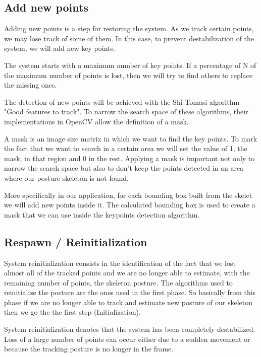 \documentclass[runningheads,a4paper,11pt]{report}
\begin{document}
\subsection{Add new points}
\par Adding new points is a step for restoring the system. As we track certain points, we may lose track of some of them. In this case, to prevent destabilization of the system, we will add new key points.
\par The system starts with a maximum number of key points. If a percentage of N of the maximum number of points is lost, then we will try to find others to replace the missing ones. 
\par The detection of new points will be achieved with the Shi-Tomasi algorithm "Good features to track". To narrow the search space of these algorithms, their implementations in OpenCV allow the definition of a mask. \par A mask is an image size matrix in which we want to find the key points. To mark the fact that we want to search in a certain area we will set the value of 1, the mask, in that region and 0 in the rest. Applying a mask is important not only to narrow the search space but also to don\mbox{'}t keep the points detected in an area where our posture skeleton is not found. 
\par More specifically in our application, for each bounding box built from the skelet we will add new points inside it. The calculated bounding box is used to create a mask that we can use inside the keypoints detection algorithm.
\subsection{Respawn / Reinitialization}
\par System reinitialization consists in the identification of the fact that we lost almost all of the tracked points and we are no longer able to estimate, with the remaining number of points, the skeleton posture. The algorithms used to reinitialize the posture are the ones used in the first phase. So basically from this phase if we are no longer able to track and estimate new posture of our skeleton then we go the the first step (Initialization).

\par System reinitialization denotes that the system has been completely destabilized. Loss of a large number of points can occur either due to a sudden movement or because the tracking posture is no longer in the frame.
\end{document}
